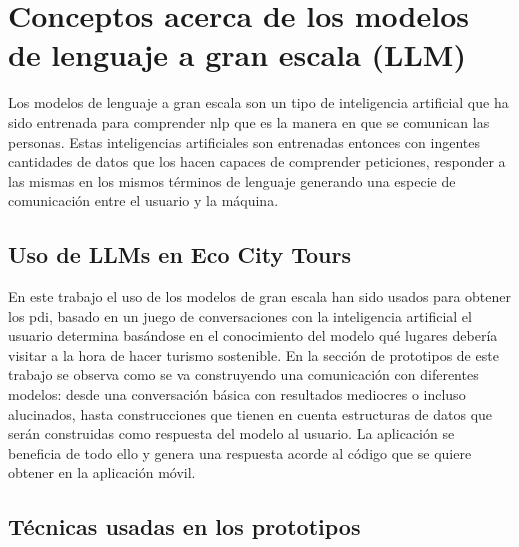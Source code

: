 \section{Conceptos acerca de los modelos de lenguaje a gran escala (LLM)}
Los modelos de lenguaje a gran escala son un tipo de inteligencia artificial que ha sido entrenada para comprender \acrfull{nlp} que es la manera en que se comunican las personas. Estas inteligencias artificiales son entrenadas entonces con ingentes cantidades de datos que los hacen capaces de comprender peticiones, responder a las mismas en los mismos términos de lenguaje generando una especie de comunicación entre el usuario y la máquina.

\subsection{Uso de LLMs en Eco City Tours}

En este trabajo el uso de los modelos de gran escala han sido usados para obtener los \acrfull{pdi}, basado en un juego de conversaciones con la inteligencia artificial el usuario determina basándose en el conocimiento del modelo qué lugares debería visitar a la hora de hacer turismo sostenible.
En la sección de prototipos de este trabajo se observa como se va construyendo una comunicación con diferentes modelos: desde una conversación básica con resultados mediocres o incluso alucinados, hasta construcciones que tienen en cuenta estructuras de datos que serán construidas como respuesta del modelo al usuario. La aplicación se beneficia de todo ello y genera una respuesta acorde al código que se quiere obtener en la aplicación móvil.
\subsection{Técnicas usadas en los prototipos}
